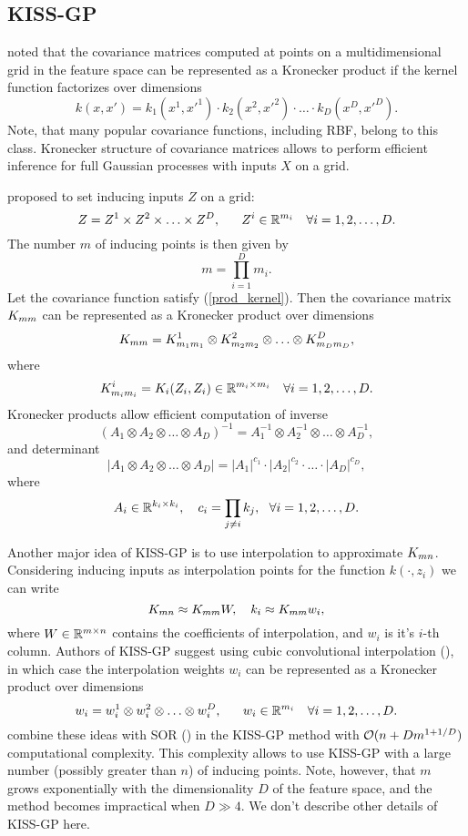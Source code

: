 \subsection{KISS-GP}
\label{kiss_gp}

  \citet{saatci2012} noted that the covariance matrices computed at points on a
  multidimensional grid in the feature space can be represented as a Kronecker
  product if the kernel function factorizes over dimensions
  \begin{equation}
  \label{prod_kernel}
    k(x, x') = k_1(x^1, x'^1)\cdot k_2(x^2, x'^2)\cdot \ldots\cdot k_D(x^D, x'^D).
  \end{equation}
  Note, that many popular covariance functions, including RBF, belong to this class.
  Kronecker structure of covariance matrices allows to perform efficient inference
  for full Gaussian processes with inputs $X$ on a grid.

  \citet{wilson2015} proposed to set inducing inputs $Z$ on a grid:
  \[
    Z = Z^1 \times Z^2 \times \ldots \times Z^D,~~~~~Z^i \in \mathbb{R}^{m_i}~~~\forall i = 1, 2, \ldots, D.
  \]
  The number $m$  of inducing points is then given by
  \[
    m = \prod_{i=1}^D m_{i}.
  \]
  Let the covariance function satisfy (\ref{prod_kernel}). Then the covariance
  matrix $K_{mm}$ can be represented as a Kronecker product over dimensions
  \[
    K_{mm} = K_{m_1 m_1}^1 \otimes K^2_{m_2 m_2} \otimes \ldots \otimes
    K^D_{m_D m_D},
  \]
  where
  \[
    K^i_{m_i m_i} = K_i(Z_i, Z_i) \in \mathbb{R}^{m_i \times m_i}~~~\forall i = 1, 2, \ldots, D.
  \]
  Kronecker products allow efficient computation of inverse
  \[
    (A_1 \otimes A_2 \otimes \ldots \otimes A_D)^{-1} =
    A_1^{-1} \otimes A_2^{-1} \otimes \ldots \otimes A_D^{-1},
  \]
  and determinant
  \[
    |A_1 \otimes A_2 \otimes \ldots \otimes A_D| = |A_1|^{c_1} \cdot
    |A_2|^{c_2} \cdot \ldots \cdot |A_D|^{c_D},
  \]
  where
  \[
    A_i\in\mathbb{R}^{k_i \times k_i},~~~c_i = \prod_{j \ne i} k_j,~~\forall i = 1, 2, \ldots, D.
  \]

  Another major idea of KISS-GP is to use interpolation to approximate $K_{mn}$.
  Considering inducing inputs as interpolation points for the function
  $k(\cdot, z_i)$ we can write
  \begin{equation}
  \label{kernel_interpolation}
    K_{mn} \approx K_{mm} W,~~~k_{i} \approx K_{mm} w_i,
  \end{equation}
  where $W \in \mathbb{R}^{m \times n}$ contains the coefficients of interpolation, and
  $w_i$ is it's $i$-th column. Authors of KISS-GP suggest using cubic
  convolutional interpolation (\citet{keys1981}), in which case the interpolation
  weights $w_i$ can be represented as a Kronecker product over dimensions
  \[
    w_i = w_i^1 \otimes w_i^2 \otimes \ldots \otimes w_i^D,~~~~~w_i \in \mathbb{R}^{m_i}~~~\forall i = 1, 2, \ldots, D.
  \]
  \citet{wilson2015} combine these ideas with SOR (\citet{silverman1985})
  in the KISS-GP method with $\mathcal{O}(n + D m^{1 + 1/D})$ computational
  complexity. This complexity allows to use KISS-GP with a large number (possibly
  greater than $n$) of inducing points. Note, however, that $m$ grows
  exponentially with the dimensionality $D$ of the feature space, and the
  method becomes impractical when $D \gg 4$. We don't describe other details of
  KISS-GP here.

